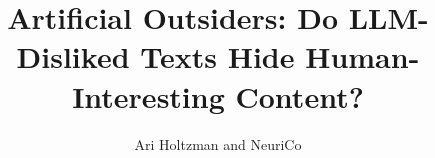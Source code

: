 \documentclass{article}
\title{Artificial Outsiders: Do LLM-Disliked Texts Hide Human-Interesting Content?}
\author{Ari Holtzman and NeuriCo}
\begin{document}
\maketitle

\begin{abstract}

\end{abstract}










\end{document}
